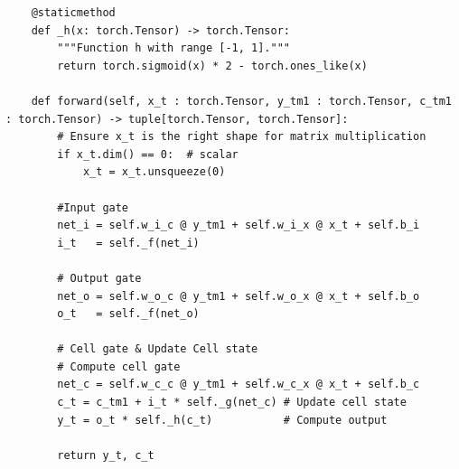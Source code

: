 \documentclass[twoside,a4paper,10pt,DIV=12,BCOR=12mm]{scrartcl}
\begin{document}
\begin{lstlisting}
    @staticmethod
    def _h(x: torch.Tensor) -> torch.Tensor:
        """Function h with range [-1, 1]."""
        return torch.sigmoid(x) * 2 - torch.ones_like(x)
    
    def forward(self, x_t : torch.Tensor, y_tm1 : torch.Tensor, c_tm1 : torch.Tensor) -> tuple[torch.Tensor, torch.Tensor]:
        # Ensure x_t is the right shape for matrix multiplication
        if x_t.dim() == 0:  # scalar
            x_t = x_t.unsqueeze(0)
        
        #Input gate
        net_i = self.w_i_c @ y_tm1 + self.w_i_x @ x_t + self.b_i
        i_t   = self._f(net_i)
        
        # Output gate
        net_o = self.w_o_c @ y_tm1 + self.w_o_x @ x_t + self.b_o
        o_t   = self._f(net_o)
        
        # Cell gate & Update Cell state
        # Compute cell gate
        net_c = self.w_c_c @ y_tm1 + self.w_c_x @ x_t + self.b_c
        c_t = c_tm1 + i_t * self._g(net_c) # Update cell state
        y_t = o_t * self._h(c_t)           # Compute output
        
        return y_t, c_t
\end{lstlisting}



\end{document}
